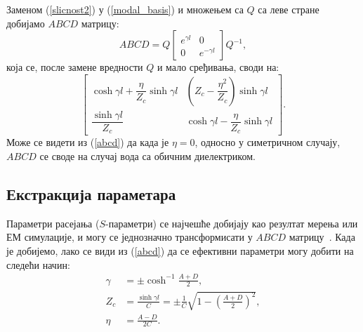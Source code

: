 \documentclass[main.tex]{subfiles}
\begin{document}
Заменом (\ref{slicnost2}) у (\ref{modal_basis}) и множењем са $Q$ са леве стране добијамо $ABCD$ матрицу:
\begin{equation}\label{decomp}
ABCD = Q\begin{bmatrix} e^{\gamma l} & 0 \\ 0 & e^{-\gamma l} \end{bmatrix}Q^{-1},
\end{equation}
која се, после замене вредности $Q$ и мало сређивања, своди на:
\begin{equation}\label{abcd}
\begin{bmatrix}
\cosh{\gamma l} + \dfrac{\eta}{Z_c}\sinh{\gamma l } & \left( Z_c - \dfrac{\eta^2}{Z_c} \right) \sinh{\gamma l} \\
\dfrac{\sinh{\gamma l}}{Z_c} & \cosh{\gamma l} - \dfrac{\eta}{Z_c}\sinh{\gamma l }
\end{bmatrix}.
\end{equation}
Може се видети из (\ref{abcd}) да када је $\eta = 0$, односно у симетричном случају, $ABCD$ се своде на случај вода са обичним диелектриком.

\subsection{Екстракција параметара}
Параметри расејања ($S$-параметри) се најчешће добијају као резултат мерења или ЕМ симулације, и могу се једнозначно трансформисати у $ABCD$ матрицу~\cite{Pozar:05}. Када је добијемо, лако се види из (\ref{abcd}) да се ефективни параметри могу добити на следећи начин:
\begin{align}
\gamma & = \pm \cosh^{-1}\frac{A+D}{2},\label{a2gama}\\
Z_c & = \frac{\sinh{\gamma l}}{C} = \pm\frac{1}{C}\sqrt{1 - \left( \frac{A+D}{2}\right)^2},\label{a2zc}\\
\eta & = \frac{A-D}{2C}.\label{a2eta}
\end{align}
\end{document}
